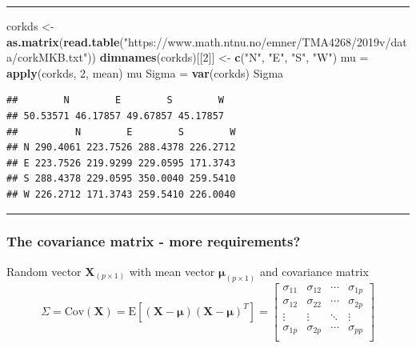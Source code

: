 \documentclass[]{article}
\newenvironment{Shaded}{\begin{snugshade}}{\end{snugshade}}
\newcommand{\DecValTok}[1]{\textcolor[rgb]{0.00,0.00,0.81}{#1}}
\newcommand{\KeywordTok}[1]{\textcolor[rgb]{0.13,0.29,0.53}{\textbf{#1}}}
\newcommand{\NormalTok}[1]{#1}
\newcommand{\StringTok}[1]{\textcolor[rgb]{0.31,0.60,0.02}{#1}}
\begin{document}
\begin{center}\rule{0.5\linewidth}{\linethickness}\end{center}

\begin{Shaded}
\begin{Highlighting}[]
\NormalTok{corkds <-}\StringTok{ }\KeywordTok{as.matrix}\NormalTok{(}\KeywordTok{read.table}\NormalTok{(}\StringTok{"https://www.math.ntnu.no/emner/TMA4268/2019v/data/corkMKB.txt"}\NormalTok{))}
\KeywordTok{dimnames}\NormalTok{(corkds)[[}\DecValTok{2}\NormalTok{]] <-}\StringTok{ }\KeywordTok{c}\NormalTok{(}\StringTok{"N"}\NormalTok{, }\StringTok{"E"}\NormalTok{, }\StringTok{"S"}\NormalTok{, }\StringTok{"W"}\NormalTok{)}
\NormalTok{mu =}\StringTok{ }\KeywordTok{apply}\NormalTok{(corkds, }\DecValTok{2}\NormalTok{, mean)}
\NormalTok{mu}
\NormalTok{Sigma =}\StringTok{ }\KeywordTok{var}\NormalTok{(corkds)}
\NormalTok{Sigma}
\end{Highlighting}
\end{Shaded}

\begin{verbatim}
##        N        E        S        W 
## 50.53571 46.17857 49.67857 45.17857 
##          N        E        S        W
## N 290.4061 223.7526 288.4378 226.2712
## E 223.7526 219.9299 229.0595 171.3743
## S 288.4378 229.0595 350.0040 259.5410
## W 226.2712 171.3743 259.5410 226.0040
\end{verbatim}

\begin{center}\rule{0.5\linewidth}{\linethickness}\end{center}

\hypertarget{the-covariance-matrix---more-requirements}{%
\subsubsection{The covariance matrix - more
requirements?}\label{the-covariance-matrix---more-requirements}}

Random vector \(\mathbf{X}_{(p\times 1)}\) with mean vector
\(\mathbf{\mu}_{(p\times 1)}\) and covariance matrix
\[\Sigma=\text{Cov}(\mathbf{X})=\text{E}[(\mathbf{X}-\mathbf{\mu})(\mathbf{X}-\mathbf{\mu})^T]=
\left[ \begin{array}{cccc}
    \sigma_{11} & \sigma_{12} & \cdots & \sigma_{1p}\\
    \sigma_{12} & \sigma_{22} & \cdots & \sigma_{2p}\\
    \vdots & \vdots & \ddots & \vdots\\
    \sigma_{1p} & \sigma_{2p} & \cdots & \sigma_{pp}\\
\end{array} \right]\]
\end{document}
